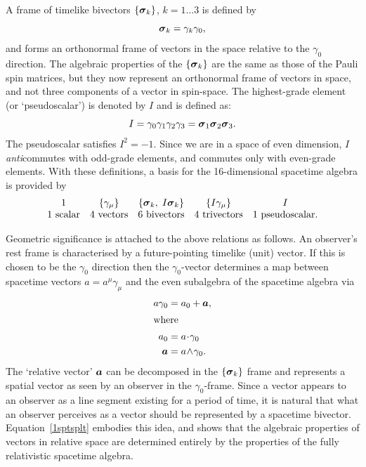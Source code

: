 \documentclass[a4paper]{article}
\numberwithin{equation}{section}
\newcommand{\dt}{\! \cdot \!}
\newcommand{\wdg}{\! \wedge \!}
\newcommand{\eqv}{=}
\newcommand{\gam}{\gamma}
\newcommand{\sig}{\mbox{\boldmath $\sigma$}}
\newcommand{\ba}{\mbox{\boldmath $a$}}
\newcommand{\bsig}{\mbox{\boldmath $\sig$}}
\newcommand{\si}{\bsig_1}
\newcommand{\sj}{\bsig_2}
\newcommand{\sk}{\bsig_3}
\newcommand{\sigk}{\bsig_k}
\newcommand{\gi}{\gamma_{1}}
\newcommand{\gj}{\gamma_{2}}
\newcommand{\gk}{\gamma_{3}}
\newcommand{\go}{\gamma_{0}}
\newcommand{\gamdm}{\gamma_\mu}
\begin{document}
A frame of timelike bivectors $\{\sig_k\}$, $k = 1 \ldots 3$ is
defined by
%
\begin{equation}
\sig_k \eqv  \gam_k\go,
\label{1defsig}
\end{equation}
%
and forms an orthonormal frame of vectors in the space relative to the
$\go$ direction.  The algebraic properties of the $\{\sig_k\}$ are the
same as those of the Pauli spin matrices, but they now represent an
orthonormal frame of vectors in space, and not three components of a
vector in spin-space.  The highest-grade element (or `pseudoscalar')
is denoted by $I$ and is defined as:
%
\begin{equation}
I \eqv \go \gi \gj \gk = \si\sj\sk .
\end{equation}
%
The pseudoscalar satisfies $I^2=-1$.  Since we are in a space of even
dimension, $I$ {\em anti\/}commutes with odd-grade elements, and
commutes only with even-grade elements.  With these definitions, a
basis for the 16-dimensional spacetime algebra is provided by
%
\begin{equation}
\begin{array}{ccccc}
1 &  \{ \gamdm \} & \{ \sigk, \; I\sigk \} & \{ I \gamdm \} & I \\ 
\text{1 scalar} & \text{4 vectors} & \text{6 bivectors} & 
\text{4 trivectors} & \text{1 pseudoscalar}  .
\end{array} 
\end{equation}
%


Geometric significance is attached to the above relations as follows.
An observer's rest frame is characterised by a future-pointing
timelike (unit) vector. If this is chosen to be the $\go$ direction
then the $\go$-vector determines a map between spacetime vectors
$a=a^\mu\gamdm$ and the even subalgebra of the spacetime algebra via
%
\begin{align}
a \go &= a_0 + \ba, \label{1sptsplt} \\
%
\intertext{where}
%
a_0 &= a \dt \go \\
\ba &= a \wdg \go.
\end{align}
%
The `relative vector' $\ba$ can be decomposed in the $\{\sig_k\}$
frame and represents a spatial vector as seen by an observer in the
$\go$-frame.  Since a vector appears to an observer as a line segment
existing for a period of time, it is natural that what an observer
perceives as a vector should be represented by a spacetime bivector.
Equation~\eqref{1sptsplt} embodies this idea, and shows that the algebraic
properties of vectors in relative space are determined entirely by the
properties of the fully relativistic spacetime algebra.
\end{document}
